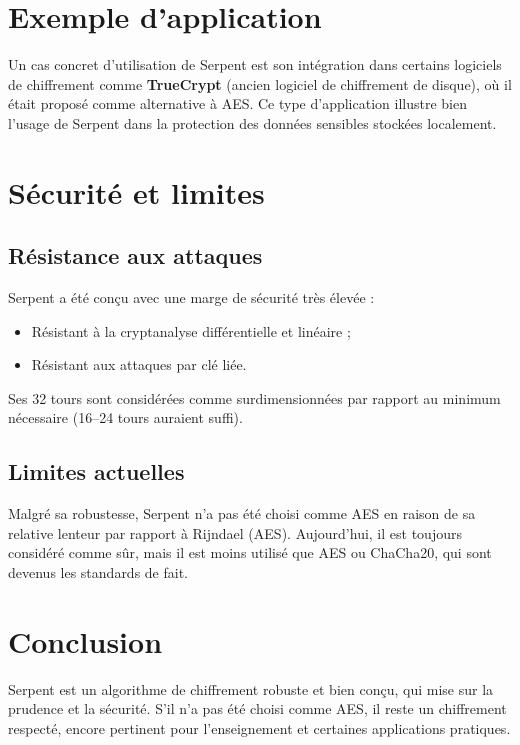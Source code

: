 \documentclass[12pt,a4paper]{report}
\begin{document}
\section*{Exemple d’application}

Un cas concret d’utilisation de Serpent est son intégration dans certains logiciels de chiffrement comme \textbf{TrueCrypt} (ancien logiciel de chiffrement de disque), où il était proposé comme alternative à AES.  
Ce type d’application illustre bien l’usage de Serpent dans la protection des données sensibles stockées localement.

\section*{Sécurité et limites}

\setcounter{subsection}{0}

\subsection{Résistance aux attaques}
Serpent a été conçu avec une marge de sécurité très élevée :
\begin{itemize}
    \item Résistant à la cryptanalyse différentielle et linéaire ;
    \item Résistant aux attaques par clé liée.
\end{itemize}
Ses 32 tours sont considérées comme surdimensionnées par rapport au minimum nécessaire (16–24 tours auraient suffi).

\subsection{Limites actuelles}

Malgré sa robustesse, Serpent n’a pas été choisi comme AES en raison de sa relative lenteur par rapport à Rijndael (AES).  
Aujourd’hui, il est toujours considéré comme sûr, mais il est moins utilisé que AES ou ChaCha20, qui sont devenus les standards de fait.

\section*{Conclusion}

Serpent est un algorithme de chiffrement robuste et bien conçu, qui mise sur la prudence et la sécurité.  
S’il n’a pas été choisi comme AES, il reste un chiffrement respecté, encore pertinent pour l’enseignement et certaines applications pratiques.
\end{document}
